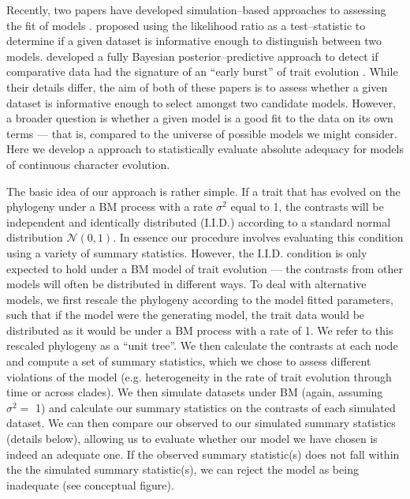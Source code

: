 \documentclass[a4paper,12pt]{article}
\begin{document}
Recently, two papers have developed simulation--based approaches to assessing the fit of models \citep{Boettiger2012, SlaterPennell}. \citet{Boettiger2012} proposed using the likelihood ratio as a test--statistic to determine if a given dataset is informative enough to distinguish between two models. \citet{SlaterPennell} developed a fully Bayesian posterior--predictive approach to detect if comparative data had the signature of an ``early burst'' of trait evolution \citep[see also][]{Harmon2003, FreckletonHarvey2006}. While their details differ, the aim of both of these papers is to assess whether a given dataset is informative enough to select amongst two candidate models. However, a broader question is whether a given model is a good fit to the data on its own terms --- that is, compared to the universe of possible models we might consider. Here we develop a approach to statistically evaluate absolute adequacy for models of continuous character evolution.

The basic idea of our approach is rather simple. If a trait that has evolved on the phylogeny under a BM process with a rate $\sigma^2$ equal to 1, the contrasts \citep[\textit{sensu}][see below]{Felsenstein1985} will be independent and identically distributed (I.I.D.) according to a standard normal distribution $\mathcal{N}(0,1)$. In essence our procedure involves evaluating this condition using a variety of summary statistics. However, the I.I.D. condition is only expected to hold under a BM model of trait evolution --- the contrasts from other models will often be distributed in different ways. To deal with alternative models, we first rescale the phylogeny according to the model fitted parameters, such that if the model were the generating model, the trait data would be distributed as it would be under a BM process with a rate of 1. We refer to this rescaled phylogeny as a ``unit tree''. We then calculate the contrasts at each node and compute a set of summary statistics, which we chose to assess different violations of the model (e.g. heterogeneity in the rate of trait evolution through time or across clades). We then simulate datasets under BM (again, assuming $\sigma^2 =$ 1) and calculate our summary statistics on the contrasts of each simulated dataset. We can then compare our observed to our simulated summary statistics (details below), allowing us to evaluate whether our model we have chosen is indeed an adequate one. If the observed summary statistic(s) does not fall within the the simulated summary statistic(s), we can reject the model as being inadequate (see conceptual figure).
\end{document}
